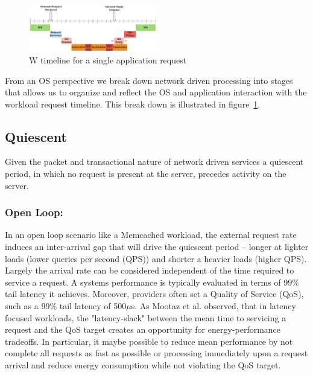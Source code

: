 \label{sec:workflow}


\begin{figure}
\centering
\includegraphics[width=0.5\textwidth]{figures/timeline_chart}
\caption[]{W timeline for a single application request}
\label{fig:timeline}
\end{figure}

From an OS perspective we break down network driven processing into stages that allows us to organize and reflect the OS and application interaction with the workload request timeline.  This break down is illustrated in figure~\ref{fig:timeline}.   

\subsection{Quiescent}
Given the packet and transactional nature of network driven services a quiescent period, in which no request is present at the server, precedes activity on the server. 

\subsubsection{Open Loop:}
In an open loop scenario like a Memcached workload, the external request rate induces an inter-arrival gap that will drive the quiescent period -- longer at lighter loads (lower queries per second (QPS)) and shorter a heavier loads (higher QPS). Largely the arrival rate can be considered independent of the time required to service a request.  A systems performance is typically evaluated in terms of 99\% tail latency it achieves.  Moreover, providers often set a Quality of Service (QoS), such as  a 99\% tail latency of 500${\mu}$s.  As Mootaz et al. observed, that in latency focused workloads, the "latency-slack" between the mean time to servicing a request and the QoS target creates an opportunity for energy-performance tradeoffs.  In particular, it maybe possible to reduce mean performance by not complete all requests as fast as possible or processing immediately upon a request arrival and reduce energy consumption while not violating the QoS target.  

